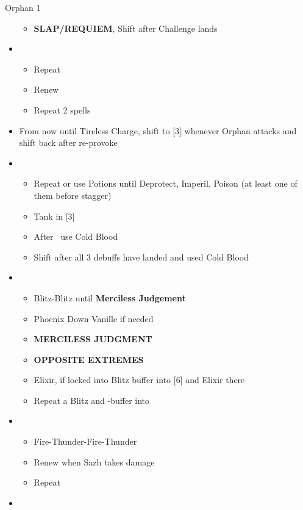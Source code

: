 \begin{battle}[3:00]{Orphan 1}
\begin{itemize}
			      \begin{itemize}
				      \item \textbf{SLAP/REQUIEM}, Shift after Challenge lands
			      \end{itemize}
			\item \fifth
			      \begin{itemize}
				      \item Repeat
				      \item Renew
				      \item Repeat 2 spells
			      \end{itemize}
			\item From now until Tireless Charge, shift to [3] whenever Orphan attacks and shift back after re-provoke
			\item \fifth
			      \begin{itemize}
				      \item Repeat or use Potions until Deprotect, Imperil, Poison (at least one of them before stagger)
				      \item Tank in [3]
				      \item After \stagger\ use Cold Blood
				      \item Shift after all 3 debuffs have landed and used Cold Blood
			      \end{itemize}
			\item \fourth
			      \begin{itemize}
				      \item Blitz-Blitz until \textbf{Merciless Judgement}
				      \item Phoenix Down Vanille if needed
				      \item \textbf{MERCILESS JUDGMENT}
				      \item \textbf{OPPOSITE EXTREMES}
				      \item Elixir, if locked into Blitz buffer into [6] and Elixir there
				      \item Repeat a Blitz and \rav-buffer into
			      \end{itemize}
			\item \sixth
			      \begin{itemize}
				      \item Fire-Thunder-Fire-Thunder
				      \item Renew when Sazh takes damage
				      \item Repeat
			      \end{itemize}
			\item \fourth
			      \begin{itemize}

\end{itemize}
\end{itemize}
\end{battle}
